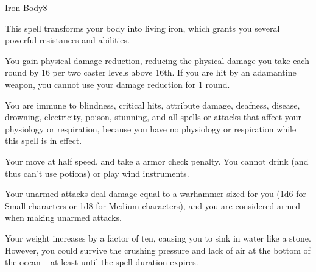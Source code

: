 \begin{spellsection}{Iron Body}{8}
\begin{spellheader}
\end{spellheader}
\begin{spellcontent}
    \begin{spelltargetinginfo}
    \end{spelltargetinginfo}
    \begin{spelleffects}
        \spelleffect This spell transforms your body into living iron, which grants you several powerful resistances and abilities.
        \par You gain physical damage reduction, reducing the physical damage you take each round by 16  per two caster levels above 16th. If you are hit by an adamantine weapon, you cannot use your damage reduction for 1 round.
        \par You are immune to blindness, critical hits, attribute damage, deafness, disease, drowning, electricity, poison, stunning, and all spells or attacks that affect your physiology or respiration, because you have no physiology or respiration while this spell is in effect.
        \par Your move at half speed, and take a  armor check penalty. You cannot drink (and thus can't use potions) or play wind instruments.
        \par Your unarmed attacks deal damage equal to a warhammer sized for you (1d6 for Small characters or 1d8 for Medium characters), and you are considered armed when making unarmed attacks.
        \par Your weight increases by a factor of ten, causing you to sink in water like a stone. However, you could survive the crushing pressure and lack of air at the bottom of the ocean -- at least until the spell duration expires.
        \spelldur \durshort \dismissable
    \end{spelleffects}
\end{spellcontent}
\begin{spellfooter}
\end{spellfooter}
\end{spellsection}

